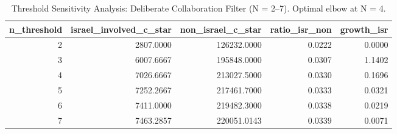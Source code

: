 \begin{table}
\caption{Threshold Sensitivity Analysis: Deliberate Collaboration Filter (N = 2–7). Optimal elbow at N = 4.}
\label{tab:threshold_sensitivity}
\begin{tabular}{rrrrr}
\toprule
n\_threshold & israel\_involved\_c\_star & non\_israel\_c\_star & ratio\_isr\_non & growth\_isr \\
\midrule
2 & 2807.0000 & 126232.0000 & 0.0222 & 0.0000 \\
3 & 6007.6667 & 195848.0000 & 0.0307 & 1.1402 \\
4 & 7026.6667 & 213027.5000 & 0.0330 & 0.1696 \\
5 & 7252.2667 & 217461.7000 & 0.0333 & 0.0321 \\
6 & 7411.0000 & 219482.3000 & 0.0338 & 0.0219 \\
7 & 7463.2857 & 220051.0143 & 0.0339 & 0.0071 \\
\bottomrule
\end{tabular}
\end{table}
